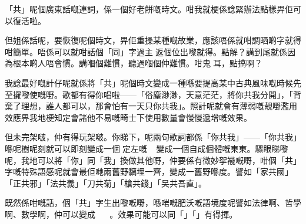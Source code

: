 「共」呢個廣東話嘅連詞，係一個好老餅嘅時文。咁我就梗係諗緊辦法點樣畀佢可以復活啦。

但姐係話呢，要恢復呢個時文，畀佢重操某種嘅故業，應該唔係就咁調晒啲字就得咁簡單。唔係可以就咁話個「同」字過主返個位出嚟就得。點解？講到尾就係因為根本啲人唔會慣。講嗰個難慣，聽過嗰個仲難慣。咁鬼󱱹耳，點搞啊？

我諗最好嘅計仔呢就係將「共」呢個時文變成一種喺要提高某中古典風味嘅時候先至攞嚟使嘅嘢。歌都有得你唱啦——「俗塵渺渺，天意茫茫，將你共我分開」，「背棄了理想，誰人都可以，那會怕有一天只你共我」。照計呢就會有薄弱嘅靚嘢濫用效應畀我地梗知定會諸他不易嘅畸士下使用數量會慢慢遞增嘅效果。

但未完架啵，仲有得玩架啵。你睇下，呢兩句歌詞都係「你共我」——「你共我」喺呢樹呢刻就可以即刻變成一個定左嘅，變成一個自成個體嘅東東。驟眼睇嚟呢，我地可以將「你」同「我」換做其他嘢，仲要係有微妙挐褦嘅嘢，咁個「共」字嘅特殊語感呢就會最佢哋兩舊野黐埋一齊，變成一舊野喺度。譬如「家共國」「正共邪」「法共義」「刀共菊」「槍共錢」「㕦共吾直」。

既然係咁嘅話，個「共」字生出嚟嘅嘢，喺啱嘅肥沃嘅語境度呢譬如法律啊、哲學啊、數學啊，仲可以變成 。效果可能可以同「」「」有得揮。








